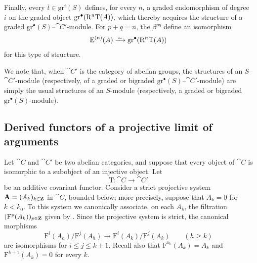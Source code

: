\begin{env}[13.6.6]
Finally, every $\overline{t}\in\mathrm{gr}^i(S)$ defines, for every
$n$, a graded endomorphism of degree $i$ on the graded object
$\mathrm{gr}^\bullet(\mathrm{R}^n\mathrm{T}(A))$, which thereby acquires the
structure of a graded
$\mathrm{gr}^\bullet(S)$--$\cat{C}'$-module.
For $p+q=n$, the $\beta^{pq}$ define an isomorphism
\[
  \mathrm{E}^{(n)}(A)
  \isoto
  \mathrm{gr}^\bullet(\RR^n\mathrm{T}(A))
\]
for this type of structure.

We note that, when $\cat{C}'$ is the category of abelian groups, the
structures of an $S$--$\cat{C}'$-module (respectively, of a graded or
bigraded $\mathrm{gr}^\bullet(S)$--$\cat{C}'$-module) are simply the
usual structures of an $S$-module (respectively, a graded or
bigraded $\mathrm{gr}^\bullet(S)$-module).
\end{env}

\subsection{Derived functors of a projective limit of arguments}
\label{subsection:0.13.7}
\label{0.13.7}

\begin{env}[13.7.1]
\label{0.13.7.1}
Let $\cat{C}$ and $\cat{C}'$ be two abelian categories, and suppose
that every object of $\cat{C}$ is isomorphic to a subobject of an
injective object.
Let
\[
  \mathrm{T}:\cat{C}\longrightarrow\cat{C}'
\]
be an additive covariant functor.
Consider a strict projective system
$\mathbf{A}=(A_k)_{k\in\mathbf{Z}}$ in $\cat{C}$, bounded below; more
precisely, suppose that $A_k=0$ for $k<k_0$.
To this system we canonically associate, on each $A_k$, the
filtration $(\mathrm{F}^p(A_k))_{p\in\mathbf{Z}}$ given by
.
Since the projective system is strict, the canonical morphisms
\begin{equation}
\label{0.13.7.1.1}
\tag{13.7.1.1}
  \mathrm{F}^i(A_h)/\mathrm{F}^j(A_h)
  \longrightarrow
  \mathrm{F}^i(A_k)/\mathrm{F}^j(A_k)
  \qquad(h\geq k)
\end{equation}
are isomorphisms for $i\leq j\leq k+1$.
Recall also that
$\mathrm{F}^{k_0}(A_k)=A_k$ and
$\mathrm{F}^{k+1}(A_k)=0$ for every $k$.
\end{env}


